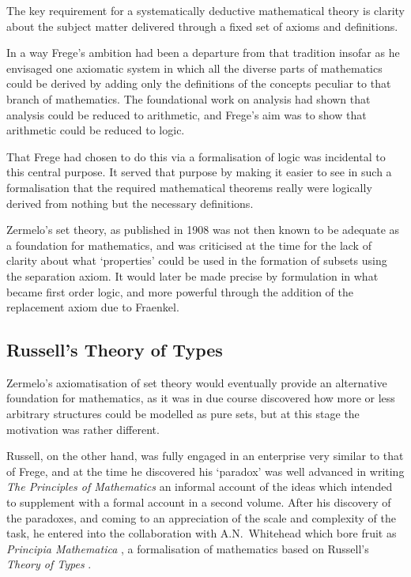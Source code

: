 \documentclass[10pt,titlepage]{book}
\begin{document}
The key requirement for a systematically deductive mathematical theory is clarity about the subject matter delivered through a fixed set of axioms and definitions.

In a way Frege's ambition had been a departure from that tradition insofar as he envisaged one axiomatic system in which all the diverse parts of mathematics could be derived by adding only the definitions of the concepts peculiar to that branch of mathematics.
The foundational work on analysis had shown that analysis could be reduced to arithmetic, and Frege's aim was to show that arithmetic could be reduced to logic.

That Frege had chosen to do this via a formalisation of logic was incidental to this central purpose.
It served that purpose by making it easier to see in such a formalisation that the required mathematical theorems really were logically derived from nothing but the necessary definitions.

Zermelo's set theory, as published in 1908 was not then known to be adequate as a foundation for mathematics, and was criticised at the time for the lack of clarity about what `properties' could be used in the formation of subsets using the separation axiom.
It would later be made precise by formulation in what became first order logic, and more powerful through the addition of the replacement axiom due to Fraenkel.

\subsection{Russell's Theory of Types}

Zermelo's axiomatisation of set theory would eventually provide an alternative foundation for mathematics, as it was in due course discovered how more or less arbitrary structures could be modelled as pure sets, but at this stage the motivation was rather different.

Russell, on the other hand, was fully engaged in an enterprise very similar to that of Frege, and at the time he discovered his `paradox' was well advanced in writing \emph{The Principles of Mathematics}\cite{russellPRM} an informal account of the ideas which intended to  supplement with a formal account in a second volume.
After his discovery of the paradoxes, and coming to an appreciation of the scale and complexity of the task, he entered into the collaboration with A.N.~Whitehead which bore fruit as \emph{Principia Mathematica} \cite{russell1913}, a formalisation of mathematics based on Russell's \emph{Theory of Types} \cite{russell1908}.
\end{document}
